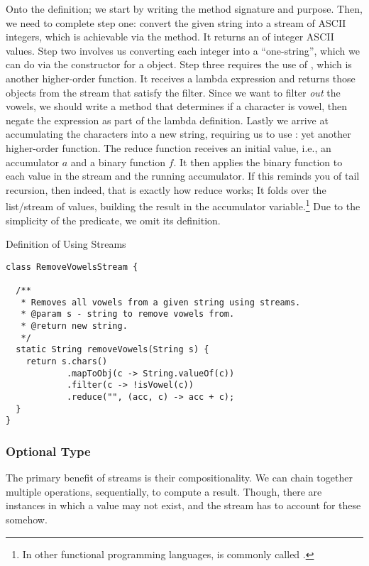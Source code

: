 Onto the definition; we start by writing the method signature and purpose. Then, we need to complete step one: convert the given string into a stream of ASCII integers, which is achievable via the  method. It returns an  of integer ASCII values. Step two involves us converting each integer into a ``one-string'', which we can do via the constructor for a  object. Step three requires the use of , which is another higher-order function. It receives a lambda expression and returns those objects from the stream that satisfy the filter. Since we want to filter \textit{out} the vowels, we should write a method that determines if a character is vowel, then negate the expression as part of the lambda definition. Lastly we arrive at accumulating the characters into a new string, requiring us to use : yet another higher-order function. The reduce function receives an initial value, i.e., an accumulator $a$ and a binary function $f$. It then applies the binary function to each value in the stream and the running accumulator. If this reminds you of tail recursion, then indeed, that is exactly how reduce works; It folds over the list/stream of values, building the result in the accumulator variable.\footnote{In other functional programming languages,  is commonly called .} Due to the simplicity of the  predicate, we omit its definition.

\begin{cl}[]{Definition of  Using Streams}
\begin{lstlisting}[language=MyJava]
class RemoveVowelsStream {

  /**
   * Removes all vowels from a given string using streams.
   * @param s - string to remove vowels from.
   * @return new string.
   */
  static String removeVowels(String s) {
    return s.chars()
            .mapToObj(c -> String.valueOf(c))
            .filter(c -> !isVowel(c))
            .reduce("", (acc, c) -> acc + c);
  }
}
\end{lstlisting}
\end{cl}

\subsubsection*{Optional Type}
The primary benefit of streams is their compositionality. We can chain together multiple operations, sequentially, to compute a result. Though, there are instances in which a value may not exist, and the stream has to account for these somehow.

